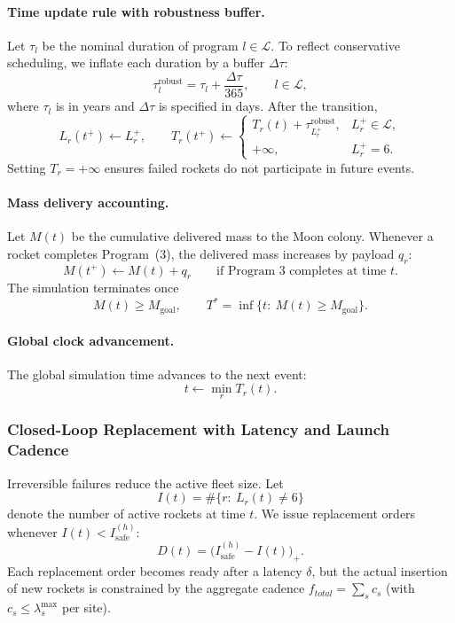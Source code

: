﻿\documentclass{mcmthesis}
\begin{document}
\paragraph{Time update rule with robustness buffer.}
Let $\tau_l$ be the nominal duration of program $l\in\mathcal{L}$.
To reflect conservative scheduling, we inflate each duration by a buffer $\Delta\tau$:
\[
\tau_l^{\text{robust}}=\tau_l+\frac{\Delta\tau}{365},\qquad l\in\mathcal{L},
\]
where $\tau_l$ is in years and $\Delta\tau$ is specified in days.
After the transition,
\[
L_r(t^+) \leftarrow L_r^{+},\qquad
T_r(t^+) \leftarrow
\begin{cases}
T_r(t) + \tau_{L_r^{+}}^{\text{robust}}, & L_r^{+}\in\mathcal{L},\\
+\infty, & L_r^{+}=6.
\end{cases}
\]
Setting $T_r=+\infty$ ensures failed rockets do not participate in future events.

\paragraph{Mass delivery accounting.}
Let $M(t)$ be the cumulative delivered mass to the Moon colony. Whenever a rocket completes Program~(3),
the delivered mass increases by payload $q_r$:
\[
M(t^+) \leftarrow M(t) + q_r \qquad \text{if Program~3 completes at time }t.
\]
The simulation terminates once
\[
M(t)\ge M_{\text{goal}},
\qquad
T^{*}=\inf\{t:\ M(t)\ge M_{\text{goal}}\}.
\]

\paragraph{Global clock advancement.}
The global simulation time advances to the next event:
\[
t \leftarrow \min_r T_r(t).
\]

\subsubsection{Closed-Loop Replacement with Latency and Launch Cadence}
\label{sec:model2_replacement}

Irreversible failures reduce the active fleet size. Let
\[
I(t)=\#\{r:\ L_r(t)\neq 6\}
\]
denote the number of active rockets at time $t$.
We issue replacement orders whenever $I(t)<I_{\text{safe}}^{(h)}$:
\[
D(t)=\big(I_{\text{safe}}^{(h)}-I(t)\big)_+.
\]
Each replacement order becomes ready after a latency $\delta$, but the actual insertion of new rockets is
constrained by the aggregate cadence $f_{total}=\sum_s c_s$ (with $c_s\le\lambda_s^{\text{max}}$ per site).
\end{document}
